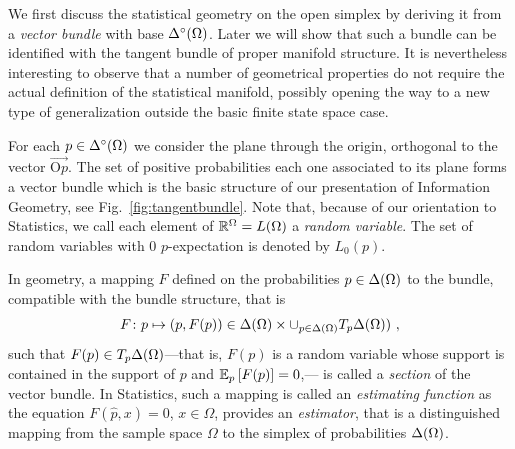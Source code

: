 \documentclass[12pt,a4paper]{amsart}
\begin{document}
\begin{exercise} \tiny
We first discuss the statistical geometry on the open simplex by deriving it from a \emph{vector bundle} with base $\Delta^\circ(\Omega)$. Later we will show that such a bundle can be identified with the tangent bundle of proper manifold structure. It is nevertheless interesting to observe that a number of geometrical properties do not require the actual definition of the statistical manifold, possibly opening the way to a new type of generalization outside the basic finite state space case.

For each $p \in \Delta^\circ(\Omega)$ we consider the plane through the origin, orthogonal to the vector $\overrightarrow{\text{O}p}$. The set of positive probabilities each one associated to its plane forms a vector bundle which is the basic structure of our presentation of Information Geometry, see Fig.~\ref{fig:tangentbundle}. Note that, because of our orientation to Statistics, we call each element of $\mathbb R^\Omega = L(\Omega)$ a \emph{random variable}. The set of random variables with 0 $p$-expectation is denoted by $L_0(p)$. 
%
\end{exercise}

In geometry, a mapping $F$ defined on the  probabilities $p \in \Delta(\Omega)$ to the bundle, compatible with the bundle structure, that is
%
\begin{equation*}
  F \colon p \mapsto (p, F(p)) \in \Delta(\Omega) \times \cup_{p\in\Delta(\Omega)} T_p\Delta(\Omega)) \ ,
\end{equation*}
%
such that $F(p) \in T_p\Delta(\Omega)$---that is, $F(p)$ is a random variable whose support is contained in the support of $p$ and ${\operatorname{\mathbb E}}_{p}\left[F(p)\right] = 0$,--- is called a \emph{section}  of the vector bundle. In Statistics, such a mapping is called an \emph{estimating function} as the equation $F(\hat p,x) = 0$, $x \in \Omega$, provides an \emph{estimator}, that is a distinguished mapping from the sample space $\Omega$ to the simplex of probabilities $\Delta(\Omega)$.
   
\end{document}
